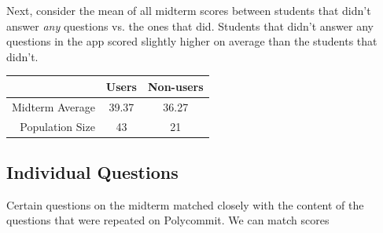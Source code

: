  \par Next, consider the mean of all midterm scores between students that didn't answer \textit{any} questions vs. the ones that did. Students that didn't answer any questions in the app scored slightly higher on average than the students that didn't.
  
 \begin{tabular}{ r c c }
  & Users & Non-users \\
  \hline			
 Midterm Average & 39.37 & 36.27 \\
 Population Size & 43 & 21
\end{tabular}

\subsection{Individual Questions}
Certain questions on the midterm matched closely with the content of the questions that were repeated on Polycommit. We can match scores 


 